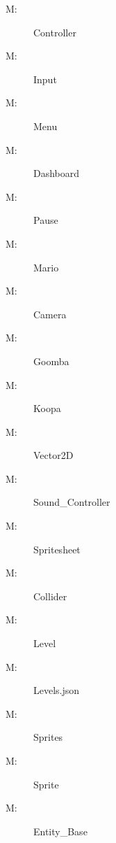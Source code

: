 \documentclass[12pt, titlepage]{article}
\newcounter{mnum}
\newcommand{\mthemnum}{M\themnum}
\begin{document}
\begin{description}
\item [ \mthemnum \label{mController}:] Controller
\item [ \mthemnum \label{mInput}:] Input
\item [ \mthemnum \label{mMenu}:] Menu
\item [ \mthemnum \label{mDashboard}:] Dashboard
\item [ \mthemnum \label{mPause}:] Pause
\item [ \mthemnum \label{mMario}:] Mario
\item [ \mthemnum \label{mCamera}:] Camera
\item [ \mthemnum \label{mGoomba}:] Goomba
\item [ \mthemnum \label{mKoopa}:] Koopa
\item [ \mthemnum \label{mVector2D}:] Vector2D
\item [ \mthemnum \label{mSound}:] Sound\_Controller
\item [ \mthemnum \label{mSpritesheet}:] Spritesheet
\item [ \mthemnum \label{mCollider}:] Collider
\item [ \mthemnum \label{mLevel}:] Level
\item [ \mthemnum \label{mLevels}:] Levels.json
\item [ \mthemnum \label{mSprites}:] Sprites
\item [ \mthemnum \label{mSprite}:] Sprite
\item [ \mthemnum \label{mEntityB}:] Entity\_Base
\end{description}
\end{document}
